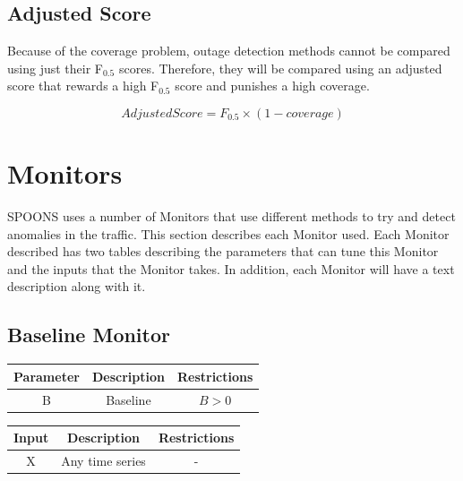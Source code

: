\documentclass[12pt]{ucthesis}
\begin{document}
\subsection{Adjusted Score}
\label{outage-detection-metrics-adjusted-score}
Because of the coverage problem, outage detection methods cannot be compared using just their F$_{0.5}$ scores.
Therefore, they will be compared using an adjusted score that rewards a high F$_{0.5}$ score and punishes a high coverage.

\begin{equation}
   Adjusted Score = F_{0.5} \times (1 - coverage)
\end{equation}

\section{Monitors}
\label{outage-detection-monitors}
SPOONS uses a number of Monitors that use different methods to try and detect anomalies in the traffic.
This section describes each Monitor used.
Each Monitor described has two tables describing the parameters that can tune this Monitor and
the inputs that the Monitor takes. In addition, each Monitor will have a text description along with it.

\subsection{Baseline Monitor}
\label{outage-detection-monitors-Baseline}
\begin{table}[H]
   \begin{center}
      \begin{tabular}{|c|c|c|}
         \hline
            Parameter & Description & Restrictions \\
         \hline
            B & Baseline & $ B > 0 $\\
         \hline
      \end{tabular}
   \end{center}
\end{table}

\begin{table}[H]
   \begin{center}
      \begin{tabular}{|c|c|c|}
         \hline
            Input & Description & Restrictions \\
         \hline
            X & Any time series & - \\
         \hline
      \end{tabular}
   \end{center}
\end{table}
\end{document}
